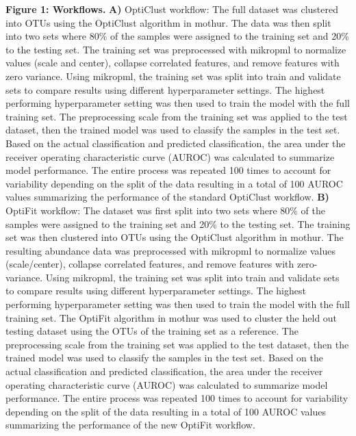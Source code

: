 \documentclass[
]{article}
\begin{document}
\textbf{Figure 1: Workflows.} \textbf{A)} OptiClust workflow: The full
dataset was clustered into OTUs using the OptiClust algorithm in mothur.
The data was then split into two sets where 80\% of the samples were
assigned to the training set and 20\% to the testing set. The training
set was preprocessed with mikropml to normalize values (scale and
center), collapse correlated features, and remove features with zero
variance. Using mikropml, the training set was split into train and
validate sets to compare results using different hyperparameter
settings. The highest performing hyperparameter setting was then used to
train the model with the full training set. The preprocessing scale from
the training set was applied to the test dataset, then the trained model
was used to classify the samples in the test set. Based on the actual
classification and predicted classification, the area under the receiver
operating characteristic curve (AUROC) was calculated to summarize model
performance. The entire process was repeated 100 times to account for
variability depending on the split of the data resulting in a total of
100 AUROC values summarizing the performance of the standard OptiClust
workflow. \textbf{B)} OptiFit workflow: The dataset was first split into
two sets where 80\% of the samples were assigned to the training set and
20\% to the testing set. The training set was then clustered into OTUs
using the OptiClust algorithm in mothur. The resulting abundance data
was preprocessed with mikropml to normalize values (scale/center),
collapse correlated features, and remove features with zero-variance.
Using mikropml, the training set was split into train and validate sets
to compare results using different hyperparameter settings. The highest
performing hyperparameter setting was then used to train the model with
the full training set. The OptiFit algorithm in mothur was used to
cluster the held out testing dataset using the OTUs of the training set
as a reference. The preprocessing scale from the training set was
applied to the test dataset, then the trained model was used to classify
the samples in the test set. Based on the actual classification and
predicted classification, the area under the receiver operating
characteristic curve (AUROC) was calculated to summarize model
performance. The entire process was repeated 100 times to account for
variability depending on the split of the data resulting in a total of
100 AUROC values summarizing the performance of the new OptiFit
workflow.

\newpage
\end{document}
